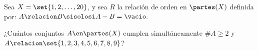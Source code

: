 \begin{enunciado}{\ejercicio}
  Sea $X = \set{1,2,\dots,20}$, y sea $R$ la relación de orden en $\partes(X)$ definida por:
  $A \relacion B \sisolosi A - B = \vacio.$

  ¿Cuántos conjuntos $A \en \partes(X)$ cumplen simultáneamente $\#A \geq 2$ y $A \relacion \set{1,2,3,4,5,6,7,8,9}$?
\end{enunciado}

\Hacer
